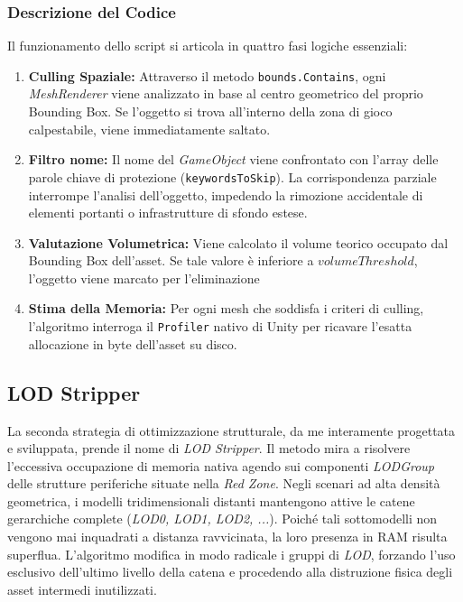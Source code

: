 \subsubsection{Descrizione del Codice}

Il funzionamento dello script si articola in quattro fasi logiche essenziali:

\begin{enumerate}    
    \item \textbf{Culling Spaziale:} Attraverso il metodo \lstinline|bounds.Contains|, ogni \textit{MeshRenderer} viene analizzato in base al centro geometrico del proprio Bounding Box. Se l'oggetto si trova all'interno della zona di gioco calpestabile, viene immediatamente saltato.
    
    \item \textbf{Filtro nome:} Il nome del \textit{GameObject} viene confrontato con l'array delle parole chiave di protezione (\lstinline|keywordsToSkip|). La corrispondenza parziale interrompe l'analisi dell'oggetto, impedendo la rimozione accidentale di elementi portanti o infrastrutture di sfondo estese.
    
    \item \textbf{Valutazione Volumetrica:} Viene calcolato il volume teorico occupato dal Bounding Box dell'asset. Se tale valore è inferiore a $volumeThreshold$, l'oggetto viene marcato per l'eliminazione
    
    \item \textbf{Stima della Memoria:} Per ogni mesh che soddisfa i criteri di culling, l'algoritmo interroga il \lstinline|Profiler| nativo di Unity per ricavare l'esatta allocazione in byte dell'asset su disco.
\end{enumerate}

\subsection{LOD Stripper}

La seconda strategia di ottimizzazione strutturale, da me interamente progettata e sviluppata, prende il nome di \textit{LOD Stripper}. Il metodo mira a risolvere l'eccessiva occupazione di memoria nativa agendo sui componenti \textit{LODGroup} delle strutture periferiche situate nella \textit{Red Zone}. Negli scenari ad alta densità geometrica, i modelli tridimensionali distanti mantengono attive le catene gerarchiche complete (\textit{LOD0, LOD1, LOD2, ...}). Poiché tali sottomodelli non vengono mai inquadrati a distanza ravvicinata, la loro presenza in RAM risulta superflua. L'algoritmo modifica in modo radicale i gruppi di \textit{LOD}, forzando l'uso esclusivo dell'ultimo livello della catena e procedendo alla distruzione fisica degli asset intermedi inutilizzati.


